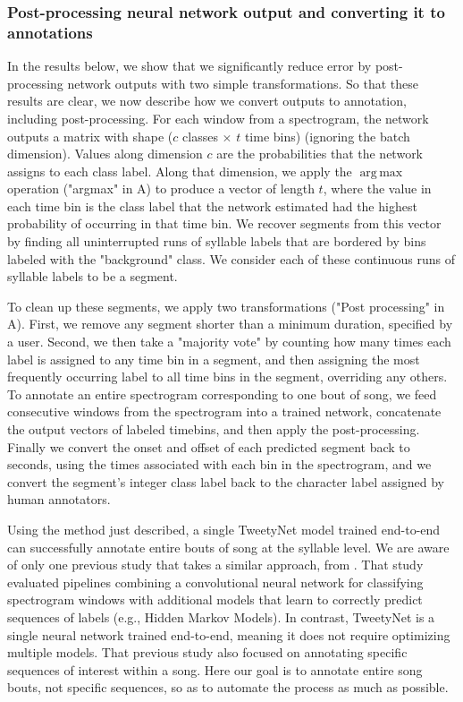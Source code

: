 \documentclass[9pt,lineno]{elife}
\begin{document}
\subsubsection{Post-processing neural network output and converting it to annotations}
\label{intro:convert-output}
In the results below, we show that we significantly reduce error 
by post-processing network outputs with two simple transformations. 
So that these results are clear, 
we now describe how we convert outputs to annotation, including post-processing.
For each window from a spectrogram, 
the network outputs a matrix with shape ($c$ classes $\times$ $t$ time bins)  
(ignoring the batch dimension). 
Values along dimension $c$ are the probabilities 
that the network assigns to each class label. 
Along that dimension, we apply the $\mathop{\mathrm{arg\,max}}$ operation 
("argmax" in A)
to produce a vector of length $t$, 
where the value in each time bin 
is the class label that the network estimated 
had the highest probability of occurring in that time bin.
We recover segments from this vector 
by finding all uninterrupted runs of syllable labels 
that are bordered by bins labeled with the "background" class. 
We consider each of these continuous runs of syllable labels to be a segment. 

To clean up these segments, we apply two transformations 
("Post processing" in A).
First, we remove any segment 
shorter than a minimum duration, specified by a user. 
Second, we then take a "majority vote"  
by counting how many times each label is assigned to any time bin in a segment, 
and then assigning the most frequently occurring label 
to all time bins in the segment, overriding any others.  
To annotate an entire spectrogram corresponding to one bout of song, 
we feed consecutive windows from the spectrogram into a trained network, 
concatenate the output vectors of labeled timebins, 
and then apply the post-processing. 
Finally we convert the onset and offset of each predicted segment 
back to seconds, 
using the times associated with each bin in the spectrogram, 
and we convert the segment's integer class label 
back to the character label assigned by human annotators.

Using the method just described, a single TweetyNet model trained end-to-end 
can successfully annotate entire bouts of song at the syllable level. 
We are aware of only one previous study that takes a similar approach, 
from \cite{koumura_automatic_2016-1}.
That study evaluated pipelines combining 
a convolutional neural network for classifying spectrogram windows 
with additional models that learn to correctly predict sequences of labels (e.g., Hidden Markov Models). 
In contrast, TweetyNet is a single neural network trained end-to-end, 
meaning it does not require optimizing multiple models.  
That previous study also focused on annotating specific sequences of interest within a song. 
Here our goal is to annotate entire song bouts, not specific sequences, 
so as to automate the process as much as possible.
\end{document}
